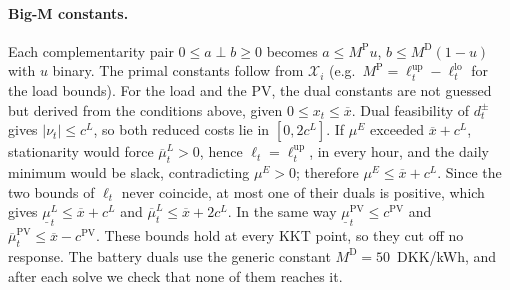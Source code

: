 \paragraph{Big-M constants.}
Each complementarity pair $0\leq a\perp b\geq0$ becomes $a\leq M^{\mathrm{P}}u$, $b\leq M^{\mathrm{D}}(1-u)$ with $u$ binary.
The primal constants follow from $\mathcal{X}_i$ (e.g.\ $M^{\mathrm{P}}=\ell^{\mathrm{up}}_t-\ell^{\mathrm{lo}}_t$ for the load bounds).
For the load and the PV, the dual constants are not guessed but derived from the conditions above, given $0\leq x_t\leq\overline{x}$.
Dual feasibility of $d^{\pm}_t$ gives $|\nu_t|\leq c^L$, so both reduced costs lie in $[0,2c^L]$.
If $\mu^E$ exceeded $\overline{x}+c^L$, stationarity would force $\overline{\mu}^L_t>0$, hence $\ell_t=\ell^{\mathrm{up}}_t$, in every hour, and the daily minimum would be slack, contradicting $\mu^E>0$; therefore $\mu^E\leq\overline{x}+c^L$.
Since the two bounds of $\ell_t$ never coincide, at most one of their duals is positive, which gives $\underline{\mu}^L_t\leq\overline{x}+c^L$ and $\overline{\mu}^L_t\leq\overline{x}+2c^L$.
In the same way $\underline{\mu}^{\mathrm{PV}}_t\leq c^{\mathrm{PV}}$ and $\overline{\mu}^{\mathrm{PV}}_t\leq\overline{x}-c^{\mathrm{PV}}$.
These bounds hold at every KKT point, so they cut off no response.
The battery duals use the generic constant $M^{\mathrm{D}}=50$~DKK/kWh, and after each solve we check that none of them reaches it.
